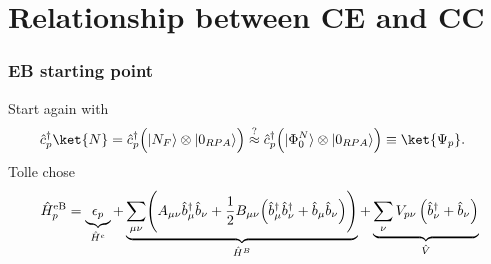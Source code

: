 \section{Relationship between CE and CC}
\begin{frame}
\frametitle{EB starting point}
Start again with
\begin{align}
\hat{c}_p^\dagger \ket{N} &= \hat{c}_p^\dagger \Bigl( |N_F\rangle \otimes |0_{RPA}\rangle \Bigr) \overset{?}{\approx} \hat{c}_p^\dagger \Bigl( |\Phi_0^N\rangle \otimes |0_{RPA}\rangle \Bigr)
\equiv \ket{\Psi_p}.
\end{align}
Tolle chose
\begin{align}
    \hat{H}_p^{\text{eB}} &= \underbrace{\epsilon_{p}}_{\hat{H}^e} + \underbrace{\sum_{\mu\nu} \Biggl( A_{\mu\nu} \hat{b}_\mu^\dagger \hat{b}_\nu + \frac{1}{2}B_{\mu\nu} \Bigl(\hat{b}_\mu^\dagger \hat{b}_\nu^\dagger + \hat{b}_\mu \hat{b}_\nu \Bigr) \Biggr)}_{\hat{H}^B} + \underbrace{\sum_{\nu} V_{p\nu} \left( \hat{b}_\nu^\dagger + \hat{b}_\nu \right)}_{\hat{V}} \label{eq:effective_hamiltonian} \\
\end{align}
\end{frame}

